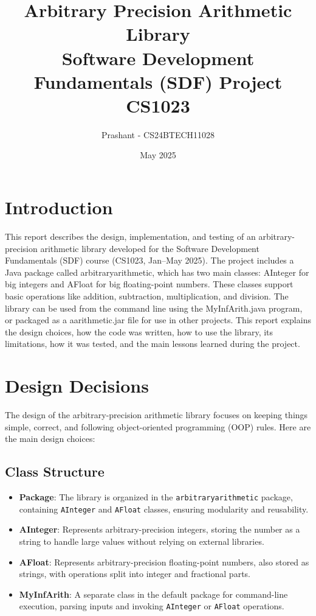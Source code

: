 \documentclass[12pt]{article}
\title{Arbitrary Precision Arithmetic Library \\ Software Development Fundamentals (SDF) Project \\ CS1023}
\author{Prashant - CS24BTECH11028}
\date{May 2025}
\begin{document}
\maketitle
\tableofcontents
\newpage

\section{Introduction}

This report describes the design, implementation, and testing of an arbitrary-precision arithmetic library developed for the Software Development Fundamentals (SDF) course (CS1023, Jan–May 2025). The project includes a Java package called arbitraryarithmetic, which has two main classes: AInteger for big integers and AFloat for big floating-point numbers. These classes support basic operations like addition, subtraction, multiplication, and division. The library can be used from the command line using the MyInfArith.java program, or packaged as a aarithmetic.jar file for use in other projects. This report explains the design choices, how the code was written, how to use the library, its limitations, how it was tested, and the main lessons learned during the project.


\section{Design Decisions}

The design of the arbitrary-precision arithmetic library focuses on keeping things simple, correct, and following object-oriented programming (OOP) rules. Here are the main design choices:

\subsection{Class Structure}

\begin{itemize}

    \item \textbf{Package}: The library is organized in the \texttt{arbitraryarithmetic} package, containing \texttt{AInteger} and \texttt{AFloat} classes, ensuring modularity and reusability.
    \item \textbf{AInteger}: Represents arbitrary-precision integers, storing the number as a string to handle large values without relying on external libraries.
    \item \textbf{AFloat}: Represents arbitrary-precision floating-point numbers, also stored as strings, with operations split into integer and fractional parts.
    \item \textbf{MyInfArith}: A separate class in the default package for command-line execution, parsing inputs and invoking \texttt{AInteger} or \texttt{AFloat} operations.
    
\end{itemize}
\end{document}
